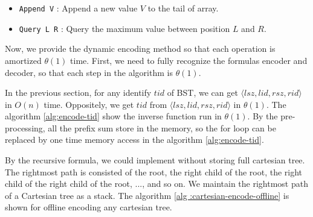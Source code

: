 \iffalse
ISMQ 已知解法有二，其一使用並查集在 $O(\alpha(n))$ 解決單一操作，
其二使用樸素的稀疏表在 $O(\log n)$完成插入操作、$O(1)$ 完成詢問操作。
其二，Fischer \cite{fischer} 提出的 $\theta(n)$ -- $\theta(1)$ 無法應用在此，
其原因在於插入元素時，無法動態決定 in-block 的最大值，必須等到整個 in-block 塞滿至預設值才可解決。

在我們的應用中維護後綴最大值，
拓展其操作成為增長區間最大值查找 (\emph{incremental range maximum query}, IRMQ)，
其支援兩項操作：
\fi

\begin{itemize}
  \item 
  	\texttt{Append V} : Append a new value $V$ to the tail of array.

  \item
    \texttt{Query L R} : Query the maximum value between position $L$
and $R$. 

\end{itemize}

Now, we provide the dynamic encoding method so that each operation is
amortized $\theta(1)$ time.  First, we need to fully recognize the
formulas encoder and decoder, so that each step in the algorithm is
$\theta(1)$.

In the previous section, for any identify $\mathit{tid}$ of BST, we
can get
$\langle\mathit{lsz},\mathit{lid},\mathit{rsz},\mathit{rid}\rangle$ in
$O(n)$ time.  Oppositely, we get $\mathit{tid}$ from
$\langle\mathit{lsz},\mathit{lid},\mathit{rsz},\mathit{rid}\rangle$ in
$\theta(1)$.  The algorithm \ref{alg:encode-tid} show the inverse
function run in $\theta(1)$.  By the pre-processing, all the prefix
sum store in the memory, so the for loop can be replaced by one time
memory access in the algorithm \ref{alg:encode-tid}.

\iffalse
接下來的幾段中，我們提供動態的編碼方式使得每一操作皆均攤 $\theta(1)$ 完成。首先，我們需要充分認知編碼相互轉換的公式，藉以在算法中完成每一步皆為 $\theta(1)$ 的要求。

在上一節提出對於任意編號 $\mathit{tid}$ 可以在 $O(n)$ 時間內得到 $\langle\mathit{lsz},\mathit{lid},\mathit{rsz},\mathit{rid}\rangle$；
相反地，可以在 $\theta(1)$ 時間內逆推得到 $\mathit{tid}$，如算法 ~\ref{alg:encode-tid}。
透過預處理，事先將所有前綴和保存下來，在算法中的迴圈可視為一次內存存取，使得時間複雜度 $\theta(1)$。
\fi



By the recursive formula,  we could implement without storing full
cartesian tree.  The rightmost path is consisted of the root, the
right child of the root, the right child of the right child of the
root, ..., and so on.  We maintain the rightmost path of a Cartesian
tree as a stack.  The algorithm \ref{alg :cartesian-encode-offline} is
shown for offline encoding any cartesian tree.

